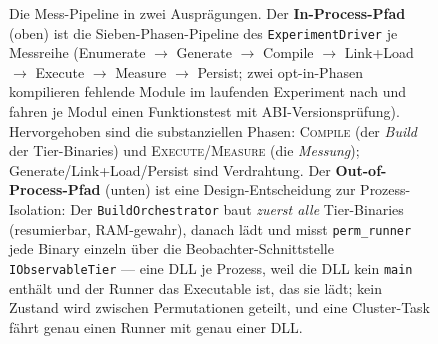 \begin{nurkurz}
\begin{figure}[htbp]
\caption{Die Mess-Pipeline in zwei Ausprägungen. Der \textbf{In-Process-Pfad} (oben) ist die
Sieben-Phasen-Pipeline des \texttt{ExperimentDriver} je Messreihe (Enumerate $\to$ Generate $\to$ Compile
$\to$ Link+Load $\to$ Execute $\to$ Measure $\to$ Persist; zwei opt-in-Phasen kompilieren fehlende Module
im laufenden Experiment nach und fahren je Modul einen Funktionstest mit ABI-Versionsprüfung). Hervorgehoben sind die substanziellen
Phasen: \textsc{Compile} (der \emph{Build} der Tier-Binaries) und \textsc{Execute}/\textsc{Measure} (die
\emph{Messung}); Generate/Link+Load/Persist sind Verdrahtung. Der \textbf{Out-of-Process-Pfad} (unten) ist
eine Design-Entscheidung zur Prozess-Isolation: Der \texttt{BuildOrchestrator} baut \emph{zuerst alle}
Tier-Binaries (resumierbar, RAM-gewahr), danach lädt und misst \texttt{perm\_runner} jede Binary einzeln
über die Beobachter-Schnittstelle \texttt{IObservableTier} --- eine DLL je Prozess, weil die DLL kein
\texttt{main} enthält und der Runner das Executable ist, das sie lädt; kein Zustand wird zwischen
Permutationen geteilt, und eine Cluster-Task fährt genau einen Runner mit genau einer
DLL.}\label{fig:pipeline}
\end{figure}


\end{nurkurz}
